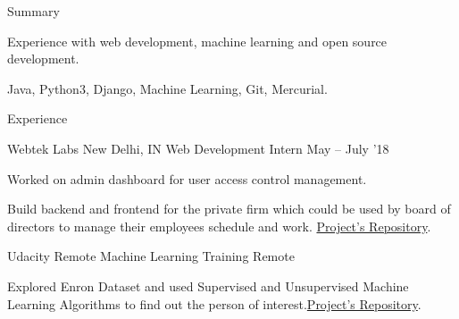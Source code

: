 \documentclass{resume} %
\begin{document}

\begin{rSection}{Summary}
  \begin{rSummarySection}
  {
    \item Experience with web development, machine learning and open source development.
    \item Java, Python3, Django, Machine Learning, Git, Mercurial.
  }
  \end{rSummarySection}
\end{rSection}


\begin{rSection}{Experience}
  \begin{rWorkSection}{Webtek Labs}
                           {New Delhi, IN}
                           {Web Development Intern}
                           {May -- July '18}
  {
    \item Worked on admin dashboard for user access control management.
    \item Build backend and frontend for the private firm which could be used by board of directors to manage their employees schedule and work. \href{https://github.com/siddhi523/WebTek}{Project's Repository}.
  }
  \end{rWorkSection}


  \begin{rWorkSection}{Udacity}
                     {Remote}
                     {Machine Learning Training}
                     {Remote}
  {
    \item Explored Enron Dataset and used Supervised and Unsupervised Machine Learning 
          Algorithms to find out the person of interest.\href{https://github.com/siddhi523/ud120-projects}{Project's Repository}.
  }
  \end{rWorkSection}
\end{rSection}

\end{document}
